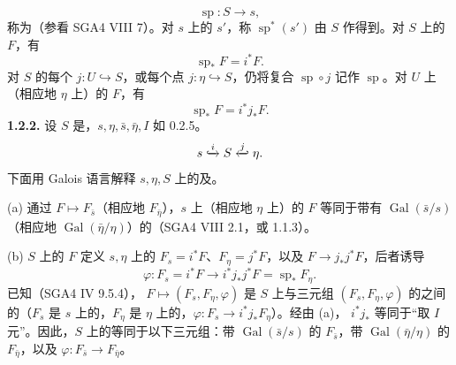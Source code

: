 \[\operatorname{sp}:S\longrightarrow s,\]
称为（参看 SGA4 VIII 7）。对 $s$ 上的 $s'$，称 $\operatorname{sp}^*(s')$ 由 $S$ 作得到。对 $S$ 上的 $F$，有
\[\operatorname{sp}_*F=i^*F.\tag{1.2.1.1}\]
对 $S$ 的每个 $j:U\hookrightarrow S$，或每个点 $j:\eta\hookrightarrow S$，仍将复合 $\operatorname{sp}\circ j$ 记作 $\operatorname{sp}$。对 $U$ 上（相应地 $\eta$ 上）的 $F$，有
\[\operatorname{sp}_*F=i^*j_*F.\tag{1.2.1.2}\]
\textbf{1.2.2.} 设 $S$ 是，$s,\eta,\bar s,\bar\eta,I$ 如 0.2.5。
\[s\lhook\joinrel\xrightarrow{i}S\xleftarrow{j}\joinrel\rhook\eta.\]
下面用 Galois 语言解释 $s,\eta,S$ 上的及。

(a) 通过 $F\mapsto F_{\bar s}$（相应地 $F_{\bar\eta}$），$s$ 上（相应地 $\eta$ 上）的 $F$ 等同于带有 $\operatorname{Gal}(\bar s/s)$（相应地 $\operatorname{Gal}(\bar\eta/\eta)$）的（SGA4 VIII 2.1，或 1.1.3）。

(b) $S$ 上的 $F$ 定义 $s,\eta$ 上的 $F_s=i^*F$、$F_\eta=j^*F$，以及 $F\to j_*j^*F$，后者诱导
\[\varphi:F_s=i^*F\longrightarrow i^*j_*j^*F=\operatorname{sp}_*F_\eta.\]
已知（SGA4 IV 9.5.4）， $F\mapsto(F_s,F_\eta,\varphi)$ 是 $S$ 上与三元组 $(F_s,F_\eta,\varphi)$ 的之间的（$F_s$ 是 $s$ 上的，$F_\eta$ 是 $\eta$ 上的，$\varphi:F_s\to i^*j_*F_\eta$）。经由 (a)， $i^*j_*$ 等同于“取 $I$ 元”。因此，$S$ 上的等同于以下三元组：带 $\operatorname{Gal}(\bar s/s)$ 的 $F_{\bar s}$，带 $\operatorname{Gal}(\bar\eta/\eta)$ 的 $F_{\bar\eta}$，以及 $\varphi:F_{\bar s}\to F_{\bar\eta}$。

